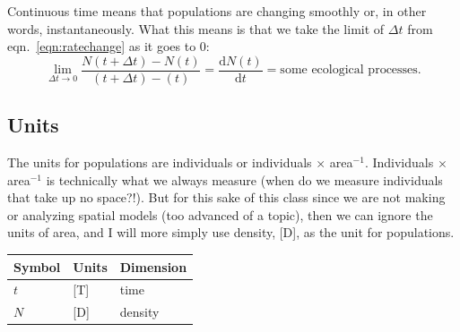 \documentclass[11pt]{article}
\begin{document}
Continuous time means that populations are changing smoothly or, in other words, instantaneously. What this means is that we take the limit of $\Delta t$  from eqn.~\ref{eqn:ratechange} as it goes to 0:
    \begin{equation}
    \lim_{\Delta t \to 0} \frac{N(t + \Delta t) - N(t)}{(t + \Delta t) - (t)} = \frac{\mathrm{d}N(t)}{\mathrm{d}t} = \textrm{some ecological processes}.
    \end{equation}



\subsection{Units}
The units for populations are individuals or individuals $\times$ area$^{-1}$. Individuals $\times$ area$^{-1}$ is technically what we always measure (when do we measure individuals that take up no space?!).  But for this sake of this class since we are not making or analyzing spatial models (too advanced of a topic), then we can ignore the units of area, and I will more simply use density, [D], as the unit for populations.


\begin{tabular}{l l l}
\hline
Symbol & Units & Dimension \\
\hline
$t$ & [T] & time \\
$N$ & [D] & density \\
\hline
\end{tabular}


    
\end{document}
